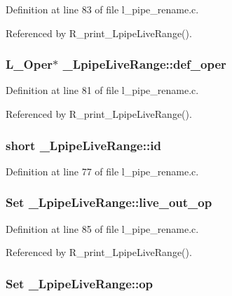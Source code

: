 Definition at line 83 of file l\_\-pipe\_\-rename.c.

Referenced by R\_\-print\_\-Lpipe\-Live\-Range().
\subsubsection{\setlength{\rightskip}{0pt plus 5cm}L\_\-Oper$\ast$ \bf{\_\-Lpipe\-Live\-Range::def\_\-oper}}\label{struct__LpipeLiveRange_517e8efcaac54001327858e68ffb4737}




Definition at line 81 of file l\_\-pipe\_\-rename.c.

Referenced by R\_\-print\_\-Lpipe\-Live\-Range().
\subsubsection{\setlength{\rightskip}{0pt plus 5cm}short \bf{\_\-Lpipe\-Live\-Range::id}}\label{struct__LpipeLiveRange_dec6a394c3b37c85975c5416fc208f97}




Definition at line 77 of file l\_\-pipe\_\-rename.c.
\subsubsection{\setlength{\rightskip}{0pt plus 5cm}Set \bf{\_\-Lpipe\-Live\-Range::live\_\-out\_\-op}}\label{struct__LpipeLiveRange_0a8215512e9cc4834195ebae83091b29}




Definition at line 85 of file l\_\-pipe\_\-rename.c.

Referenced by R\_\-print\_\-Lpipe\-Live\-Range().
\subsubsection{\setlength{\rightskip}{0pt plus 5cm}Set \bf{\_\-Lpipe\-Live\-Range::op}}\label{struct__LpipeLiveRange_6d7f7b0bcdde39f63e157c8d22fe5c86}




